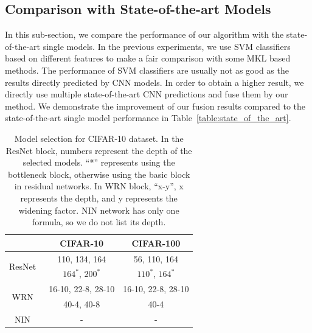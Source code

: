\documentclass[10pt,twocolumn,letterpaper]{article}
\begin{document}
\subsection{Comparison with State-of-the-art Models}

In this sub-section, we compare the performance of our algorithm with the state-of-the-art single models.
In the previous experiments, we use SVM classifiers based on different features to make a fair comparison with some MKL based methods.
The performance of SVM classifiers are usually not as good as the results directly predicted by CNN models.
In order to obtain a higher result, we directly use multiple state-of-the-art CNN predictions and fuse them by our method.
We demonstrate the improvement of our fusion results compared to the state-of-the-art single model performance in Table~\ref{table:state_of_the_art}.

\begin{table}[ht]
\begin{center}
\begin{tabular}{| c | c | c |}
    \hline
                                              & CIFAR-10             & CIFAR-100  \\\hline
\multirow{2}{*}{ResNet~\cite{he2016identity}} & 110, 134, 164        & 56, 110, 164  \\
                                              & $164^{*}$, $200^{*}$ & $110^{*}$, $164^{*}$  \\\hline
\multirow{2}{*}{WRN~\cite{zagoruyko2016wide}} & 16-10, 22-8, 28-10   & 16-10, 22-8, 28-10  \\
                                              &    40-4, 40-8        & 40-4  \\\hline
NIN~\cite{lin2013network}                     &     -                & -  \\ \hline
\end{tabular}
\end{center}
\caption{Model selection for CIFAR-10 dataset.
In the ResNet block, numbers represent the depth of the selected models.
``*'' represents using the bottleneck block, otherwise using the basic block in residual networks.
In WRN block, ``x-y'', x represents the depth, and y represents the widening factor.
NIN network has only one formula, so we do not list its depth.}
\label{table:models}
\end{table}
\end{document}
